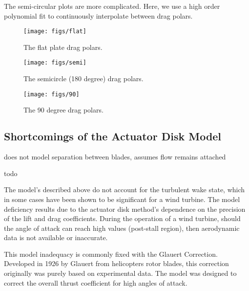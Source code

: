 The semi-circular plots are more complicated. Here, we use a high order
polynomial fit to continuously interpolate between drag polars. 

\begin{figure}[!htb]
  \begin{center}
    \texttt{[image: figs/flat]}
    \caption{The flat plate drag polars.} 
    \label{fig:flat_plate_drag}
  \end{center}
\end{figure}

\begin{figure}[!htb]
  \begin{center}
    \texttt{[image: figs/semi]}
    \caption{The semicircle (180 degree) drag polars.} 
    \label{fig:semi_drag}
  \end{center}
\end{figure}

\begin{figure}[!htb]
  \begin{center}
    \texttt{[image: figs/90]}
    \caption{The 90 degree drag polars.} 
    \label{fig:90_drag}
  \end{center}
\end{figure}


\subsection{Shortcomings of the Actuator Disk Model}
\label{subsec:wake_loss_model}

does not model separation between blades, assumes flow remains attached

todo

The model's described above do not account for the turbulent wake state,
which in some cases have been shown to be significant for a wind
turbine. The model deficiency results due to the actuator disk
method's dependence on the precision of the lift and drag
coefficients. During the operation of a wind turbine, should the angle
of attack can reach high values (post-stall region), then aerodynamic 
data is not available or inaccurate. 
   
This model inadequacy is commonly fixed with the Glauert Correction. 
Developed in 1926 by Glauert from helicopters rotor blades, this
correction originally was purely based on experimental data. The model
was designed to correct the overall thrust coefficient for high angles
of attack. 

